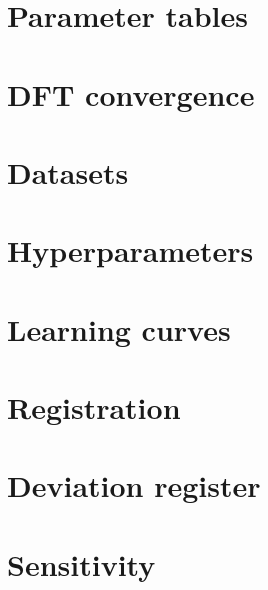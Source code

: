 
\newcommand{\nacreTitle}{Supplementary Information}
\newcommand{\nacreAuthors}{Author list pending}
\newcommand{\nacreAbstract}{Supporting material for the manuscript.}
\newcommand{\nacreTitleMark}{}
\newcommand{\nacreFootnotes}{%
  \footnotetext{\textit{$^{a}$~Affiliations pending.}}}




\section{Parameter tables}

\section{DFT convergence}

\section{Datasets}

\section{Hyperparameters}

\section{Learning curves}

\section{Registration}

\section{Deviation register}

\section{Sensitivity}


